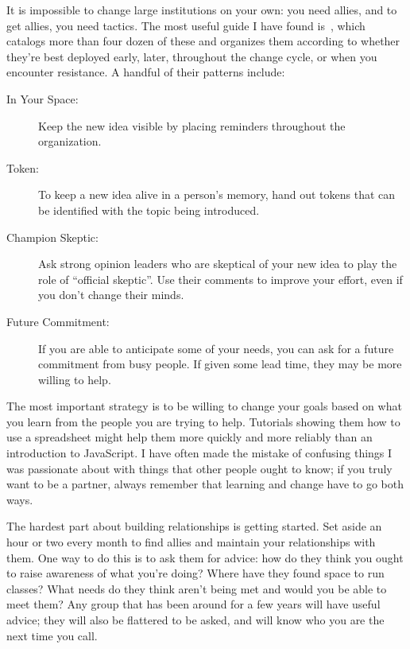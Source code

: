 
It is impossible to change large institutions on your own:
you need allies,
and to get allies,
you need tactics.
The most useful guide I have found is~\cite{Mann2015},
which catalogs more than four dozen of these
and organizes them according to whether they're best deployed early,
later,
throughout the change cycle,
or when you encounter resistance.
A handful of their patterns include:

\begin{description}

\item[In Your Space:]
  Keep the new idea visible
  by placing reminders throughout the organization.

\item[Token:]
  To keep a new idea alive in a person's memory,
  hand out tokens that can be identified with the topic being introduced.

\item[Champion Skeptic:]
  Ask strong opinion leaders who are skeptical of your new idea
  to play the role of ``official skeptic''.
  Use their comments to improve your effort,
  even if you don't change their minds.

\item[Future Commitment:]
  If you are able to anticipate some of your needs,
  you can ask for a future commitment from busy people.
  If given some lead time,
  they may be more willing to help.
  
\end{description}

The most important strategy is
to be willing to change your goals
based on what you learn from the people you are trying to help.
Tutorials showing them how to use a spreadsheet
might help them more quickly and more reliably than
an introduction to JavaScript.
I have often made the mistake of confusing things I was passionate about
with things that other people ought to know;
if you truly want to be a partner,
always remember that learning and change have to go both ways.

The hardest part about building relationships is getting started.
Set aside an hour or two every month
to find allies and maintain your relationships with them.
One way to do this is to ask them for advice:
how do they think you ought to raise awareness of what you're doing?
Where have they found space to run classes?
What needs do they think aren't being met
and would you be able to meet them?
Any group that has been around for a few years will have useful advice;
they will also be flattered to be asked,
and will know who you are the next time you call.

